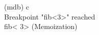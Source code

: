 
\begin{tttenv}
(mdb) c \\
Breakpoint "fib<3>" reached \\
fib<{\color{color04} 3}> (Memoization)
\end{tttenv}
